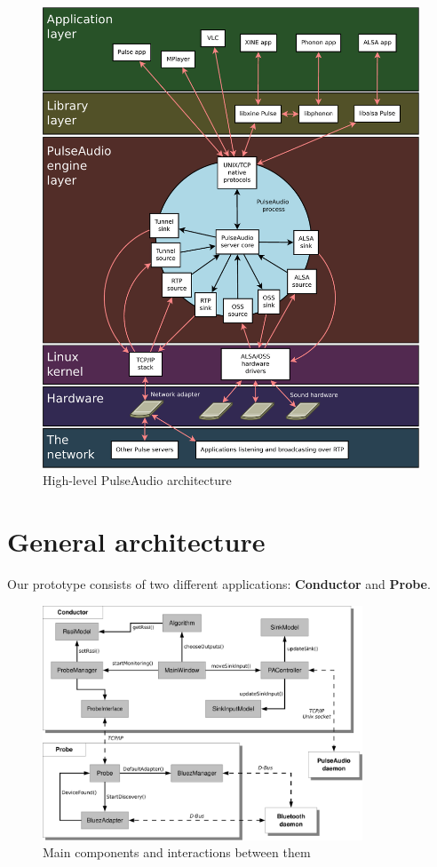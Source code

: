 \documentclass[conference]{IEEEtran}
\begin{document}
\begin{figure}[h]
\centering
\includegraphics[width=\columnwidth]{PulseAudio}
\caption{High-level PulseAudio architecture}
\label{pa}
\end{figure}


\section{General architecture}

Our prototype consists of two different applications: \mbox{\textbf{Conductor}} and \textbf{Probe}.

\begin{figure}
\centering
\includegraphics[width=0.85\textwidth]{Arch}
\caption{Main components and interactions between them}
\label{arch}
\end{figure}
\end{document}
